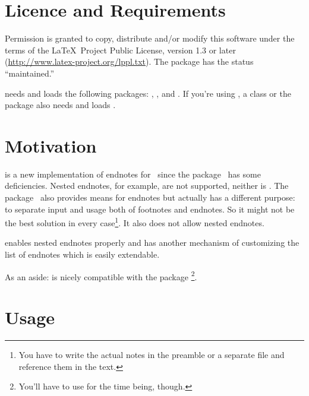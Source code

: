 \documentclass[toc=bib,toc=index]{cnpkgdoc}
\begin{document}
\section{Licence and Requirements}
Permission is granted to copy, distribute and/or modify this software under the
terms of the \LaTeX\ Project Public License, version 1.3 or later
(\url{http://www.latex-project.org/lppl.txt}). The package has the status
``maintained.''

\enotez needs and loads the following packages: ,
,  and . If you're using
, a 
class or the package  \enotez also needs and loads .

\section{Motivation}
\enotez is a new implementation of endnotes for \LaTeXe\ since the 
package~\cite{endnotes} has some deficiencies. Nested endnotes, for example, are
not supported, neither is . The  package~\cite{sepfootnotes}
also provides means for endnotes but actually has a different purpose: to
separate input and usage both of footnotes and endnotes. So it might not be the
best solution in every case\footnote{You have to write the actual notes in the
preamble or a separate file and reference them in the text.}. It also does not
allow nested endnotes.

\enotez enables nested endnotes properly and has another mechanism of customizing
the list of endnotes which is easily extendable.

As an aside: \enotez is nicely compatible with the  package%
\footnote{You'll have to use  for the time being, though.}.

\section{Usage}
\end{document}
